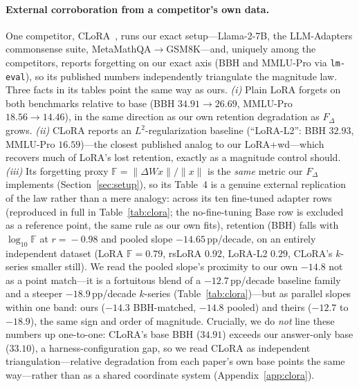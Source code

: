 \documentclass[11pt]{article}
\newcommand{\dw}{F_{\Delta}}
\begin{document}
\paragraph{External corroboration from a competitor's own data.} One competitor,
CLoRA~\citep{clora}, runs our exact setup---Llama-2-7B, the LLM-Adapters
commonsense suite, MetaMathQA$\rightarrow$GSM8K---and, uniquely among the
competitors, reports forgetting on our exact axis (BBH and MMLU-Pro via
\texttt{lm-eval}), so its published numbers independently triangulate the magnitude
law. Three facts in its tables point the same way as ours. \emph{(i)} Plain LoRA
forgets on both benchmarks relative to base (BBH $34.91\!\to\!26.69$, MMLU-Pro
$18.56\!\to\!14.46$), in the same direction as our own retention degradation as
$\dw$ grows. \emph{(ii)} CLoRA reports an $L^2$-regularization
baseline (``LoRA-L2'': BBH $32.93$, MMLU-Pro $16.59$)---the closest published
analog to our LoRA{+}wd---which recovers much of LoRA's lost retention, exactly as
a magnitude control should. \emph{(iii)} Its forgetting proxy
$\mathbb{F}=\lVert\Delta W x\rVert/\lVert x\rVert$ is the \emph{same} metric our
$\dw$ implements (Section~\ref{sec:setup}), so its Table~4 is a genuine external
replication of the law rather than a mere analogy: across its ten fine-tuned
adapter rows (reproduced in full in Table~\ref{tab:clora}; the no-fine-tuning
Base row is excluded as a reference point, the same rule as our own fits),
retention (BBH) falls with $\log_{10}\mathbb{F}$ at $r\!=\!-0.98$ and pooled slope
$-14.65$\,pp/decade, on an entirely independent dataset (LoRA $\mathbb{F}\!=\!0.79$,
rsLoRA $0.92$, LoRA-L2 $0.29$, CLoRA's $k$-series smaller still). We read the
pooled slope's proximity to our own $-14.8$ not as a point match---it is a
fortuitous blend of a $-12.7$\,pp/decade baseline family and a steeper
$-18.9$\,pp/decade $k$-series (Table~\ref{tab:clora})---but as parallel slopes
within one band: ours ($-14.3$ BBH-matched, $-14.8$ pooled) and theirs ($-12.7$
to $-18.9$), the same sign and order of magnitude. Crucially, we do \emph{not} line these
numbers up one-to-one: CLoRA's base BBH ($34.91$) exceeds our answer-only base
($33.10$), a harness-configuration gap, so we read CLoRA as independent
triangulation---relative degradation from each paper's own base points the same
way---rather than as a shared coordinate system (Appendix~\ref{app:clora}).
\end{document}

